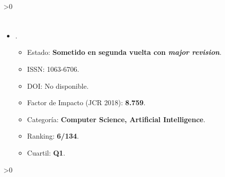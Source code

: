 \documentclass[c5paper,10pt,twoside]{book}	   	%
\newcounter{incluirPDF}
\newcommand{\incluirPaper}[2]{
	\ifnum\value{incluirPDF}>0 {
		
		\clearpage
		
		
		
		\cleardoublepage
		
	}\fi
}
\begin{document}
\incluirPaper{-}{./Papers/2019_Garcia_Cognitive}












\section{}

\begin{itemize}
	\item {}.
	
	\begin{itemize}
		\item Estado: \textbf{Sometido en segunda vuelta con \textit{major revision}}.
	    \item ISSN: 1063-6706.
		\item DOI: No disponible.
		\item Factor de Impacto (JCR 2018): \textbf{8.759}.
		\item Categoría: \textbf{Computer Science, Artificial Intelligence}.
		\item Ranking: \textbf{6/134}.
		\item Cuartil: \textbf{Q1}.
	\end{itemize}
\end{itemize}

\incluirPaper{-}{./Papers/2019_Garcia_SparkStreaming}
\clearpage{} \cleardoublepage




\backmatter
{}     
\sloppy
\printbibliography
\end{document}
